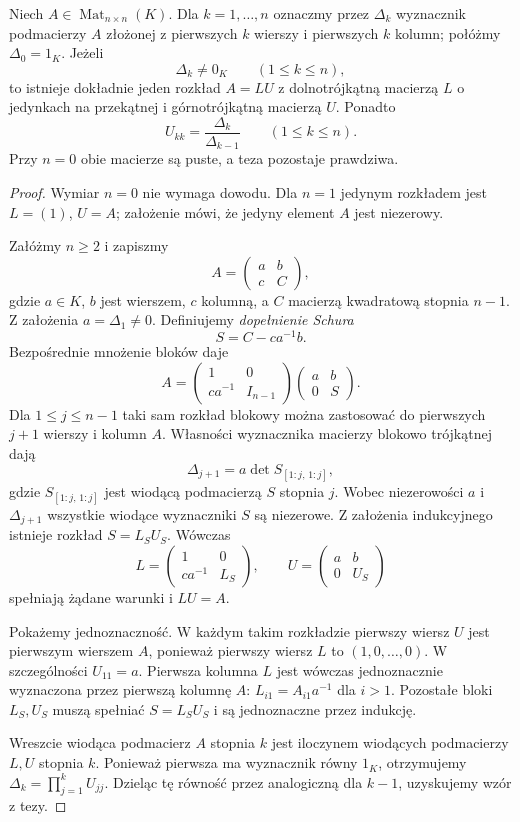 \begin{twierdzenie}
\label{thm:lin15-lu}
Niech \(A\in\operatorname{Mat}_{n\times n}(K)\).
Dla \(k=1,\ldots,n\) oznaczmy przez
\(\Delta_k\) wyznacznik podmacierzy
\(A\) złożonej z pierwszych \(k\)
wierszy i pierwszych \(k\) kolumn;
połóżmy \(\Delta_0=1_K\).
Jeżeli
\[
 \Delta_k\ne0_K\qquad(1\le k\le n),
\]
to istnieje dokładnie jeden rozkład
\(A=LU\) z dolnotrójkątną macierzą
\(L\) o jedynkach na przekątnej
i górnotrójkątną macierzą \(U\).
Ponadto
\[
 U_{kk}=\frac{\Delta_k}{\Delta_{k-1}}
 \qquad(1\le k\le n).
\]
Przy \(n=0\) obie macierze są puste,
a teza pozostaje prawdziwa.
\end{twierdzenie}
\begin{proof}
Wymiar \(n=0\) nie wymaga dowodu.
Dla \(n=1\) jedynym rozkładem
jest \(L=(1)\), \(U=A\);
założenie mówi, że
jedyny element \(A\) jest niezerowy.

Załóżmy \(n\ge2\) i zapiszmy
\[
 A=\begin{pmatrix}a&b\\c&C\end{pmatrix},
\]
gdzie \(a\in K\), \(b\) jest
wierszem, \(c\) kolumną,
a \(C\) macierzą kwadratową
stopnia \(n-1\). Z założenia
\(a=\Delta_1\ne0\).
Definiujemy \emph{dopełnienie Schura}
\[
 S=C-ca^{-1}b.
\]
Bezpośrednie mnożenie bloków daje
\[
 A=
 \begin{pmatrix}1&0\\ca^{-1}&I_{n-1}\end{pmatrix}
 \begin{pmatrix}a&b\\0&S\end{pmatrix}.
\]
Dla \(1\le j\le n-1\) taki sam
rozkład blokowy można zastosować
do pierwszych \(j+1\) wierszy
i kolumn \(A\). Własności
wyznacznika macierzy blokowo
trójkątnej dają
\[
 \Delta_{j+1}
 =a\det S_{[1:j,\,1:j]},
\]
gdzie \(S_{[1:j,\,1:j]}\)
jest wiodącą podmacierzą \(S\)
stopnia \(j\). Wobec niezerowości
\(a\) i \(\Delta_{j+1}\)
wszystkie wiodące wyznaczniki
\(S\) są niezerowe.
Z założenia indukcyjnego
istnieje rozkład \(S=L_SU_S\).
Wówczas
\[
 L=\begin{pmatrix}1&0\\ca^{-1}&L_S\end{pmatrix},
 \qquad
 U=\begin{pmatrix}a&b\\0&U_S\end{pmatrix}
\]
spełniają żądane warunki
i \(LU=A\).

Pokażemy jednoznaczność.
W każdym takim rozkładzie
pierwszy wiersz \(U\) jest
pierwszym wierszem \(A\),
ponieważ pierwszy wiersz \(L\)
to \((1,0,\ldots,0)\).
W szczególności \(U_{11}=a\).
Pierwsza kolumna \(L\)
jest wówczas jednoznacznie
wyznaczona przez pierwszą
kolumnę \(A\):
\(L_{i1}=A_{i1}a^{-1}\) dla \(i>1\).
Pozostałe bloki \(L_S,U_S\)
muszą spełniać \(S=L_SU_S\)
i są jednoznaczne przez indukcję.

Wreszcie wiodąca podmacierz
\(A\) stopnia \(k\) jest
iloczynem wiodących podmacierzy
\(L,U\) stopnia \(k\).
Ponieważ pierwsza ma
wyznacznik równy \(1_K\),
otrzymujemy
\(\Delta_k=\prod_{j=1}^{k}U_{jj}\).
Dzieląc tę równość przez
analogiczną dla \(k-1\),
uzyskujemy wzór z tezy.
\end{proof}

